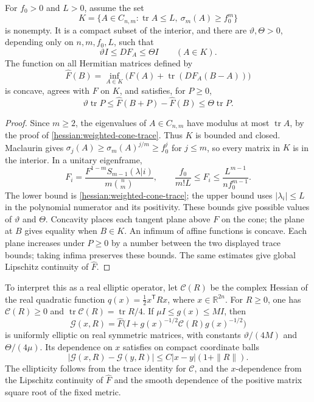 \begin{lemma}\label{hessian:uniform-elliptic-extension}
For $f_0>0$ and $L>0$, assume the set
\[
 K=\{A\in C_{n,m}:\operatorname{tr}A\leq L,
                         \ \sigma_m(A)\geq f_0^m\}
\]
is nonempty. It is a compact subset of the interior, and there are
$\vartheta,\Theta>0$, depending only on $n,m,f_0,L$, such that
\[
 \vartheta I\leq DF_A\leq\Theta I\qquad(A\in K).
\]
The function on all Hermitian matrices defined by
\[
 \widehat F(B)=\inf_{A\in K}
       \bigl(F(A)+\operatorname{tr}(DF_A(B-A))\bigr)
\]
is concave, agrees with $F$ on $K$, and satisfies, for $P\geq0$,
\[
 \vartheta\operatorname{tr}P\leq
       \widehat F(B+P)-\widehat F(B)
       \leq\Theta\operatorname{tr}P.
\]
\end{lemma}
\begin{proof}
Since $m\geq2$, the eigenvalues of $A\in C_{n,m}$ have modulus at most
$\operatorname{tr}A$, by the proof of \cref{hessian:weighted-cone-trace}.
Thus $K$ is bounded and closed. Maclaurin gives
$\sigma_j(A)\geq\sigma_m(A)^{j/m}\geq f_0^j$ for $j\leq m$,
so every matrix in $K$ is in the interior. In a unitary eigenframe,
\[
 F_i=\frac{F^{1-m}S_{m-1}(\lambda|i)}{m\binom nm},
 \qquad
 \frac{f_0}{m!L}\leq F_i\leq
                 \frac{L^{m-1}}{n f_0^{m-1}}.
\]
The lower bound is \cref{hessian:weighted-cone-trace}; the upper bound
uses $|\lambda_i|\leq L$ in the polynomial numerator and its positivity.
These bounds give possible values of $\vartheta$ and $\Theta$.
Concavity places each tangent plane above $F$ on the cone; the plane
at $B$ gives equality when $B\in K$. An infimum of affine functions is
concave. Each plane increases under $P\geq0$ by a number between the
two displayed trace bounds; taking infima preserves these bounds.
The same estimates give global Lipschitz continuity of $\widehat F$.
\end{proof}

To interpret this as a real elliptic operator, let $\mathcal C(R)$ be
the complex Hessian of the real quadratic function
$q(x)=\frac12 x^{\mathsf T}Rx$, where $x\in\mathbb R^{2n}$.
For $R\geq0$, one has $\mathcal C(R)\geq0$ and
$\operatorname{tr}\mathcal C(R)=\operatorname{tr}R/4$.
If $\mu I\leq g(x)\leq MI$, then
\[
 \mathcal G(x,R)=\widehat F
       \bigl(I+g(x)^{-1/2}\mathcal C(R)g(x)^{-1/2}\bigr)
\]
is uniformly elliptic on real symmetric matrices, with constants
$\vartheta/(4M)$ and $\Theta/(4\mu)$.
Its dependence on $x$ satisfies on compact coordinate balls
\[
 |\mathcal G(x,R)-\mathcal G(y,R)|
                      \leq C|x-y|(1+\|R\|).
\]
The ellipticity follows from the trace identity for $\mathcal C$, and the
$x$-dependence from the Lipschitz continuity of $\widehat F$ and the smooth
dependence of the positive matrix square root of the fixed metric.

